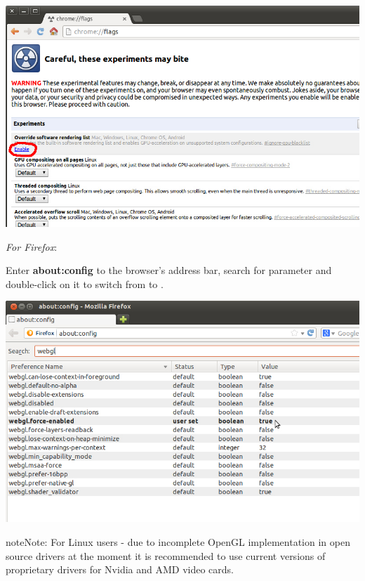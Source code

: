 \documentclass[a4paper,12pt,oneside]{sphinxmanual}
\begin{document}
\begin{DUlineblock}{0em}
\item[] 
\end{DUlineblock}

{\hfill\includegraphics[width=1.000\linewidth]{about_flags_force_webgl.jpg}\hfill}

\begin{DUlineblock}{0em}
\item[] 
\end{DUlineblock}

\emph{For Firefox}:

Enter \textbf{about:config} to the browser's address bar, search for  parameter and double-click on it to switch from  to .

{\hfill\includegraphics[width=1.000\linewidth]{about_config_force_webgl.jpg}\hfill}

\begin{notice}{note}{Note:}
For Linux users - due to incomplete OpenGL implementation in open source drivers at the moment it is recommended to use current versions of proprietary drivers for Nvidia and AMD video cards.
\end{notice}
\end{document}
